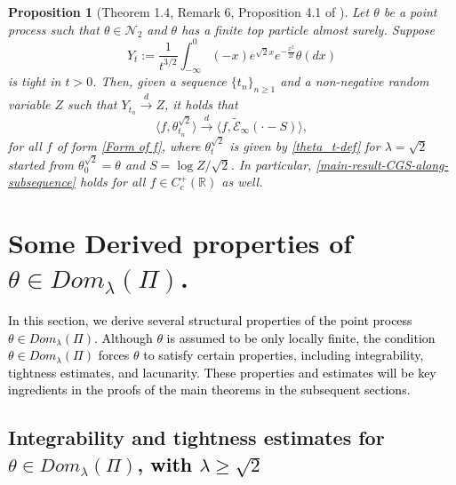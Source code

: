 \documentclass[a4paper,reqno]{amsart}%
\newcommand{\1}{\mathbf 1}
\theoremstyle{mine}
\numberwithin{theorem}{section}
\newtheorem{proposition}[theorem]{Proposition}
\numberwithin{equation}{section}
\theoremstyle{remark}
\begin{document}
\begin{proposition}[Theorem 1.4, Remark 6, Proposition 4.1 of \cite{Shekhar_Domain}]\label{excerpt-from-CGS-AAP}
Let $\theta$ be a point process such that $\theta \in \mathcal{N}_2$ and $\theta$  has a finite top particle almost surely. Suppose 
\[ Y_t := \frac{1}{t^{3/2}}\int_{-\infty}^0(-x)e^{\sqrt{2}x} e^{-\frac{x^2}{2t}} \theta(dx) \]
is tight in $t>0$. Then, given a sequence $\{t_n\}_{n\geq 1}$ and a non-negative random variable $Z$ such that $Y_{t_n} \overset{d}{\to} Z$, it holds that  
\begin{equation}\label{main-result-CGS-along-subsequence}
     \langle f, \theta_{t_n}^{\sqrt{2}} \rangle \overset{d}{\to} \langle f, \widetilde{\mathcal{E}}_\infty(\cdot - S)\rangle,
\end{equation}
for all $f$ of form \eqref{Form of f}, where $\theta_t^{\sqrt{2}}$ is given by \eqref{theta_t-def} for $\lambda =\sqrt{2}$ started from $\theta_0^{\sqrt{2}} = \theta $ and $S= \log Z/\sqrt{2}$. In particular, \eqref{main-result-CGS-along-subsequence} holds for all $f\in C_c^+(\mathbb{R})$ as well.  
\end{proposition}







\section{Some Derived properties of $\theta \in Dom_{\lambda}(\Pi)$.} \label{Section Properties theta in Don}
\textcolor{black}{
In this section, we derive several structural properties of the point process
$\theta \in Dom_{\lambda}(\Pi)$. Although $\theta$ is assumed to be only locally finite, the condition $\theta \in Dom_{\lambda}(\Pi)$
forces $\theta$ to satisfy certain properties, including integrability, tightness estimates, and lacunarity. These properties and estimates will be key
ingredients in the proofs of the main theorems in the subsequent sections.
}



\subsection{Integrability and tightness estimates for $\theta \in Dom_{\lambda}(\Pi)$, \textcolor{black}{with $\lambda \ge \sqrt 2$}}

 
\end{document}
